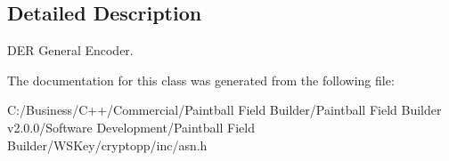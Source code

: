 \subsection{Detailed Description}
DER General Encoder. 

The documentation for this class was generated from the following file:\begin{DoxyCompactItemize}
\item 
C:/Business/C++/Commercial/Paintball Field Builder/Paintball Field Builder v2.0.0/Software Development/Paintball Field Builder/WSKey/cryptopp/inc/asn.h\end{DoxyCompactItemize}
